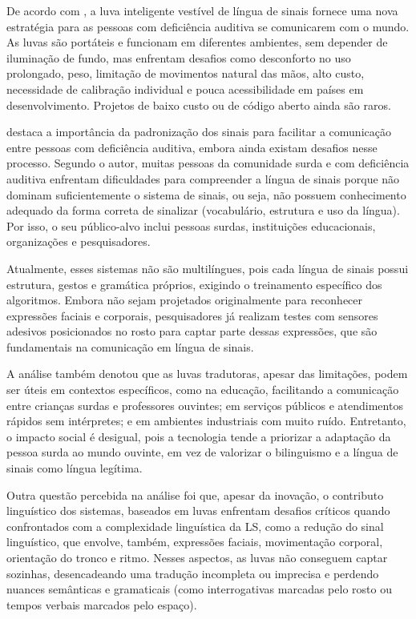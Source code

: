 \documentclass[portuguese]{textolivre}
\begin{document}
De acordo com \textcite{LuEtAl2023}, a luva inteligente vestível de língua de sinais fornece uma nova estratégia para as pessoas com deficiência auditiva se comunicarem com o mundo. As luvas são portáteis e funcionam em diferentes ambientes, sem depender de iluminação de fundo, mas enfrentam desafios como desconforto no uso prolongado, peso, limitação de movimentos natural das mãos, alto custo, necessidade de calibração individual e pouca acessibilidade em países em desenvolvimento. Projetos de baixo custo ou de código aberto ainda são raros.

\textcite{LiangJettanasenChiradeja2024} destaca a importância da padronização dos sinais para facilitar a comunicação entre pessoas com deficiência auditiva, embora ainda existam desafios nesse processo. Segundo o autor, muitas pessoas da comunidade surda e com deficiência auditiva enfrentam dificuldades para compreender a língua de sinais porque não dominam suficientemente o sistema de sinais, ou seja, não possuem conhecimento adequado da forma correta de sinalizar (vocabulário, estrutura e uso da língua). Por isso, o seu público-alvo inclui pessoas surdas, instituições educacionais, organizações e pesquisadores.

Atualmente, esses sistemas não são multilíngues, pois cada língua de sinais possui estrutura, gestos e gramática próprios, exigindo o treinamento específico dos algoritmos. Embora não sejam projetados originalmente para reconhecer expressões faciais e corporais, pesquisadores já realizam testes com sensores adesivos posicionados no rosto para captar parte dessas expressões, que são fundamentais na comunicação em língua de sinais.

A análise também denotou que as luvas tradutoras, apesar das limitações, podem ser úteis em contextos específicos, como na educação, facilitando a comunicação entre crianças surdas e professores ouvintes; em serviços públicos e atendimentos rápidos sem intérpretes; e em ambientes industriais com muito ruído. Entretanto, o impacto social é desigual, pois a tecnologia tende a priorizar a adaptação da pessoa surda ao mundo ouvinte, em vez de valorizar o bilinguismo e a língua de sinais como língua legítima.

Outra questão percebida na análise foi que, apesar da inovação, o contributo linguístico dos sistemas, baseados em luvas enfrentam desafios críticos quando confrontados com a complexidade linguística da LS, como a redução do sinal linguístico, que envolve, também, expressões faciais, movimentação corporal, orientação do tronco e ritmo. Nesses aspectos, as luvas não conseguem captar sozinhas, desencadeando uma tradução incompleta ou imprecisa e perdendo nuances semânticas e gramaticais (como interrogativas marcadas pelo rosto ou tempos verbais marcados pelo espaço).
\end{document}
